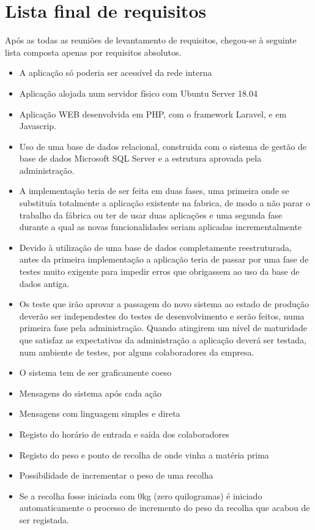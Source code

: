 \section{Lista final de requisitos}
Após as todas as reuniões de levantamento de requisitos, chegou-se à seguinte lista composta apenas por requisitos absolutos.
\begin{itemize}
	\item A aplicação só poderia ser acessível da rede interna
	\item Aplicação alojada num servidor físico com Ubuntu Server 18.04
	\item Aplicação WEB desenvolvida em PHP, com o framework Laravel, e em Javascrip.
	\item Uso de uma base de dados relacional, construida com o sistema de gestão de base de dados Microsoft SQL Server e a estrutura aprovada pela administração.
	\item A implementação teria de ser feita em duas fases, uma primeira onde se substituía totalmente a aplicação existente na fabrica, de modo a não parar o trabalho da fábrica ou ter de usar duas aplicações e uma segunda fase durante a qual as novas funcionalidades seriam aplicadas incrementalmente
	\item Devido à utilização de uma base de dados completamente reestruturada, antes da primeira implementação a aplicação teria de passar por uma fase de testes muito exigente para impedir erros que obrigassem ao uso da base de dados antiga.
	\item Os teste que irão aprovar a passagem do novo sistema ao estado de produção deverão ser independestes do testes de desenvolvimento e serão feitos, numa primeira fase pela administração. Quando atingirem um nível de maturidade que satisfaz as expectativas da administração a aplicação deverá ser testada, num ambiente de testes, por alguns colaboradores da empresa.
	\item O sistema tem de ser graficamente coeso
	\item Mensagens do sistema após cada ação
	\item Mensagens com linguagem simples e direta
	\item Registo do horário de entrada e saída dos colaboradores
	\item Registo do peso e ponto de recolha de onde vinha a matéria prima
	\item Possibilidade de incrementar o peso de uma recolha
	\item Se a recolha fosse iniciada com 0kg (zero quilogramas) é iniciado automaticamente o processo de incremento do peso da recolha que acabou de ser registada.

\end{itemize}
